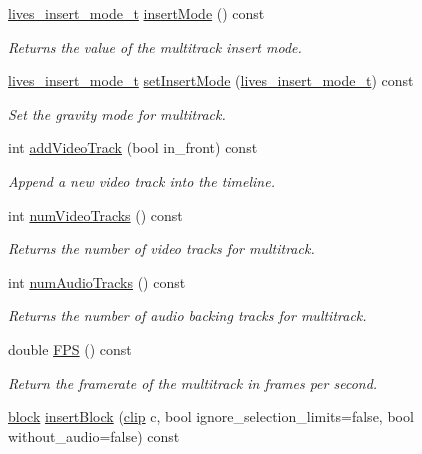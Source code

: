 \begin{DoxyCompactItemize}
\hyperlink{liblives_8hpp_a38030320722a0ce9eabf23a05e313ac5}{lives\-\_\-insert\-\_\-mode\-\_\-t} \hyperlink{classlives_1_1multitrack_af8aee088d4a3cab50e6d2565af599356}{insert\-Mode} () const 
\begin{DoxyCompactList}\small\item\em Returns the value of the multitrack insert mode. \end{DoxyCompactList}\item 
\hyperlink{liblives_8hpp_a38030320722a0ce9eabf23a05e313ac5}{lives\-\_\-insert\-\_\-mode\-\_\-t} \hyperlink{classlives_1_1multitrack_a7441bc16cee7181e2ca0f428707f0f83}{set\-Insert\-Mode} (\hyperlink{liblives_8hpp_a38030320722a0ce9eabf23a05e313ac5}{lives\-\_\-insert\-\_\-mode\-\_\-t}) const 
\begin{DoxyCompactList}\small\item\em Set the gravity mode for multitrack. \end{DoxyCompactList}\item 
int \hyperlink{classlives_1_1multitrack_a13509e7731f57c25b935cd4a03b49c05}{add\-Video\-Track} (bool in\-\_\-front) const 
\begin{DoxyCompactList}\small\item\em Append a new video track into the timeline. \end{DoxyCompactList}\item 
int \hyperlink{classlives_1_1multitrack_a98ed8d2f9eee0456283908f472facbc3}{num\-Video\-Tracks} () const 
\begin{DoxyCompactList}\small\item\em Returns the number of video tracks for multitrack. \end{DoxyCompactList}\item 
int \hyperlink{classlives_1_1multitrack_a49e84f7e6d8c162afd8f60f8075e2c1a}{num\-Audio\-Tracks} () const 
\begin{DoxyCompactList}\small\item\em Returns the number of audio backing tracks for multitrack. \end{DoxyCompactList}\item 
double \hyperlink{classlives_1_1multitrack_aa5709b2f8bc04c5e3ff14919f2e477f0}{F\-P\-S} () const 
\begin{DoxyCompactList}\small\item\em Return the framerate of the multitrack in frames per second. \end{DoxyCompactList}\item 
\hyperlink{classlives_1_1block}{block} \hyperlink{classlives_1_1multitrack_a2c59268f0edecd2597d48ac997319225}{insert\-Block} (\hyperlink{classlives_1_1clip}{clip} c, bool ignore\-\_\-selection\-\_\-limits=false, bool without\-\_\-audio=false) const 

\end{DoxyCompactItemize}

